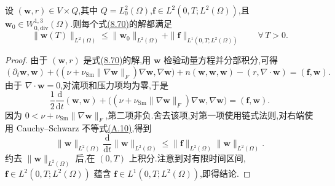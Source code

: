 \begin{lemma}
\label{lem:smagorinsky-l2-stability}
设 $(\bm{w},r)\in V\times Q$,其中 $Q=L_0^2(\Omega)$,$\bm{f}\in L^2(0,T;L^2(\Omega))$,且 $\bm{w}_0\in W_{0,\mathrm{div}}^{1,3}(\Omega)$.则每个式\hyperref[eq:smagorinsky-strong-form]{(8.70)}的解都满足
\begin{equation}\label{eq:smagorinsky-l2-stability}
 \|\bm{w}(T)\|_{L^2(\Omega)}
 \le \|\bm{w}_0\|_{L^2(\Omega)}
     +\|\bm{f}\|_{L^1(0,T;L^2(\Omega))}
 \qquad \forall\,T>0.
\end{equation}
\end{lemma}
\begin{proof}
由于 $(\bm{w},r)$ 是式\hyperref[eq:smagorinsky-strong-form]{(8.70)}的解,用 $\bm{w}$ 检验动量方程并分部积分,可得
\[
 (\partial_t\bm{w},\bm{w})
 +\bigl((\nu+\nu_{\mathrm{Sm}}\|\nabla\bm{w}\|_F)
          \nabla\bm{w},\nabla\bm{w}\bigr)
 +n(\bm{w},\bm{w},\bm{w})
 -(r,\nabla\cdot\bm{w})
 =(\bm{f},\bm{w}).
\]
由于 $\nabla\cdot\bm{w}=0$,对流项和压力项均为零,于是
\begin{equation}\label{eq:smagorinsky-energy-identity}
 \frac{1}{2}\frac{\mathrm{d}}{\mathrm{d}t}
       (\bm{w},\bm{w})
 +\bigl((\nu+\nu_{\mathrm{Sm}}\|\nabla\bm{w}\|_F)
          \nabla\bm{w},\nabla\bm{w}\bigr)
 =(\bm{f},\bm{w}).
\end{equation}
因为 $0<\nu+\nu_{\mathrm{Sm}}\|\nabla\bm{w}\|_F$,第二项非负.舍去该项,对第一项使用链式法则,对右端使用 Cauchy--Schwarz 不等式\hyperref[eq:appendix-a-10]{(A.10)},得到
\[
 \|\bm{w}\|_{L^2(\Omega)}
 \frac{\mathrm{d}}{\mathrm{d}t}\|\bm{w}\|_{L^2(\Omega)}
 \le
 \|\bm{f}\|_{L^2(\Omega)}\|\bm{w}\|_{L^2(\Omega)}.
\]
约去 $\|\bm{w}\|_{L^2(\Omega)}$ 后,在 $(0,T)$ 上积分.注意到对有限时间区间,$\bm{f}\in L^2(0,T;L^2(\Omega))$ 蕴含 $\bm{f}\in L^1(0,T;L^2(\Omega))$,即得结论.
\end{proof}

